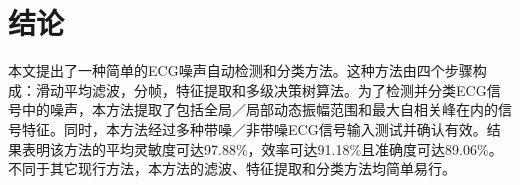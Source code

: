 \section{结论}

本文提出了一种简单的ECG噪声自动检测和分类方法。这种方法由四个步骤构成：滑动平均滤波，分帧，特征提取和多级决策树算法。为了检测并分类ECG信号中的噪声，本方法提取了包括全局／局部动态振幅范围和最大自相关峰在内的信号特征。同时，本方法经过多种带噪／非带噪ECG信号输入测试并确认有效。结果表明该方法的平均灵敏度可达97.88\%，效率可达91.18\%且准确度可达89.06\%。不同于其它现行方法，本方法的滤波、特征提取和分类方法均简单易行。